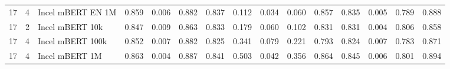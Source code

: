 \begin{tabular}{rrlrrrrrrrrrrrr}
 17 &      4 &   Incel mBERT EN 1M &                 0.859 &          0.006 &                  0.882 &                   0.837 &                 0.112 &           0.034 &                  0.060 &                   0.857 &                  0.835 &               0.005 &                    0.789 &                   0.888 \\
 17 &      2 &     Incel mBERT 10k &                 0.847 &          0.009 &                  0.863 &                   0.833 &                 0.179 &           0.060 &                  0.102 &                   0.831 &                  0.831 &               0.004 &                    0.806 &                   0.858 \\
 17 &      4 &    Incel mBERT 100k &                 0.852 &          0.007 &                  0.882 &                   0.825 &                 0.341 &           0.079 &                  0.221 &                   0.793 &                  0.824 &               0.007 &                    0.783 &                   0.871 \\  
 17 &      4 &      Incel mBERT 1M &                 0.863 &          0.004 &                  0.887 &                   0.841 &                 0.503 &           0.042 &                  0.356 &                   0.864 &                  0.845 &               0.006 &                    0.801 &                   0.894 \\
\hline
\end{tabular}
